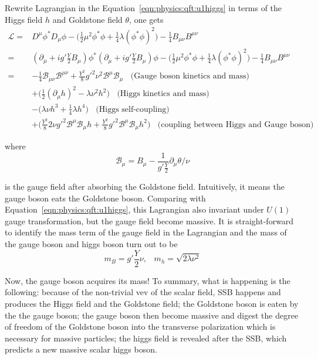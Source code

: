 \noindent Rewrite Lagrangian in the Equation~\ref{eqn:physics:qft:u1higgs} in terms of the Higgs field $h$ and Goldstone field $\theta$, one gets
\begin{equation}
\begin{split}
    \mathcal{L} =&  D^\mu\phi^* D_\mu\phi- \big(\frac{1}{2} \mu^2 \phi^*\phi + \frac{1}{4} \lambda(\phi^*\phi )^2 \big)   - \frac{1}{4}B_{\mu\nu}B^{\mu\nu} \\
    =&  (\partial_\mu +i g' \frac{Y}{2} B_\mu) \phi^* (\partial_\mu +i g' \frac{Y}{2} B_\mu) \phi- \big(\frac{1}{2} \mu^2 \phi^*\phi + \frac{1}{4} \lambda(\phi^*\phi )^2 \big)   - \frac{1}{4}B_{\mu\nu}B^{\mu\nu} \\
    =&  - \frac{1}{4}\mathcal{B}_{\mu\nu}\mathcal{B}^{\mu\nu} +  \frac{Y^2}{8} g'^2 \nu^2\mathcal{B}^\mu \mathcal{B}_\mu \;\; \text{ (Gauge boson kinetics and mass) } \\
    & + \big(\frac{1}{2} (\partial_\mu h)^2 -\lambda\nu^2h^2\big)  \;\; \text{ (Higgs kinetics and mass) }\\
    & - \big ( \lambda \nu h^3 + \frac{1}{4}\lambda h^4 \big) \;\; \text{ (Higgs self-coupling) } \\
    & + \big( \frac{Y^2}{8} 2\nu g'^2 \mathcal{B}^\mu \mathcal{B}_\mu h  + \frac{Y^2}{8} g'^2  \mathcal{B}^\mu \mathcal{B}_\mu h^2 \big)   \;\; \text{ (coupling between Higgs and Gauge boson) }
\end{split}
\end{equation}

\noindent where
\begin{equation}
    \mathcal{B}_\mu = B_\mu - \frac{1}{g'\frac{Y}{2}} \partial_\mu \theta/\nu
\end{equation}

\noindent is the gauge field after absorbing the Goldstone field. Intuitively, it means the gauge boson eats the Goldstone boson. Comparing with Equation~\ref{eqn:physics:qft:u1higgs}, this Lagrangian also invariant under $U(1)$ gauge transformation, but the gauge field become massive. It is straight-forward to identify the mass term of the gauge field in the Lagrangian and the mass of the gauge boson and higgs boson turn out to be
\begin{equation}
    m_B = g'\frac{Y}{2} \nu ,\;\;\; 
    m_h = \sqrt{2\lambda\nu^2}
\end{equation}

\noindent Now, the gauge boson acquires its mass! To summary, what is happening is the following: because of the non-trivial vev of the scalar field, SSB happens and produces the Higgs field and the Goldstone field; the Goldstone boson is eaten by the the gauge boson; the gauge boson then become massive and digest the degree of freedom of the Goldstone boson into the transverse polarization which is necessary for massive particles; the higgs field is revealed after the SSB, which predicts a new massive scalar higgs boson.


